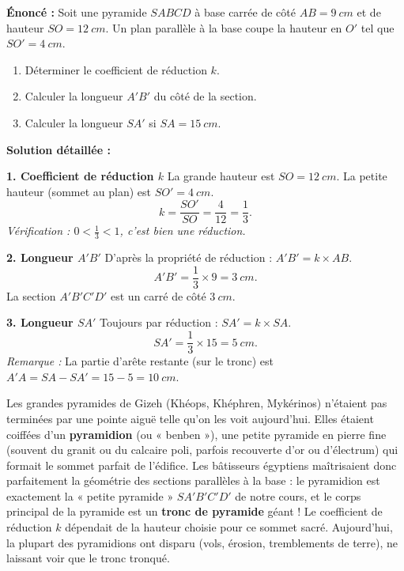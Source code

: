 \documentclass[11pt]{article}
\newcounter{popsec}
\newcounter{popsub}
\newcommand{\courssub}[1]{%
  \stepcounter{popsub}%
  \par\vspace{9pt}\noindent{\popxbold\fontsize{11.5}{13}\selectfont\color{popink}{\color{poporange}\thepopsec.\thepopsub}\hspace{6pt}#1}\par\nopagebreak\vspace{4pt}
}
\begin{document}
\begin{exoresolu}
\textbf{Énoncé :} Soit une pyramide $SABCD$ à base carrée de côté $AB = \SI{9}{cm}$ et de hauteur $SO = \SI{12}{cm}$. Un plan parallèle à la base coupe la hauteur en $O'$ tel que $SO' = \SI{4}{cm}$.
\begin{enumerate}
    \item Déterminer le coefficient de réduction $k$.
    \item Calculer la longueur $A'B'$ du côté de la section.
    \item Calculer la longueur $SA'$ si $SA = \SI{15}{cm}$.
\end{enumerate}

\textbf{Solution détaillée :}

\noindent \textbf{1. Coefficient de réduction $k$}
La grande hauteur est $SO = \SI{12}{cm}$. La petite hauteur (sommet au plan) est $SO' = \SI{4}{cm}$.
\[
k = \frac{SO'}{SO} = \frac{4}{12} = \frac{1}{3}.
\]
\emph{Vérification : $0 < \frac{1}{3} < 1$, c'est bien une réduction.}

\noindent \textbf{2. Longueur $A'B'$}
D'après la propriété de réduction : $A'B' = k \times AB$.
\[
A'B' = \frac{1}{3} \times 9 = \SI{3}{cm}.
\]
La section $A'B'C'D'$ est un carré de côté $\SI{3}{cm}$.

\noindent \textbf{3. Longueur $SA'$}
Toujours par réduction : $SA' = k \times SA$.
\[
SA' = \frac{1}{3} \times 15 = \SI{5}{cm}.
\]
\emph{Remarque :} La partie d'arête restante (sur le tronc) est $A'A = SA - SA' = 15 - 5 = \SI{10}{cm}$.
\end{exoresolu}

\courssub{Le savais-tu ?}

\begin{savaistu}
Les grandes pyramides de Gizeh (Khéops, Khéphren, Mykérinos) n'étaient pas terminées par une pointe aiguë telle qu'on les voit aujourd'hui. Elles étaient coiffées d'un \textbf{pyramidion} (ou « benben »), une petite pyramide en pierre fine (souvent du granit ou du calcaire poli, parfois recouverte d'or ou d'électrum) qui formait le sommet parfait de l'édifice.
Les bâtisseurs égyptiens maîtrisaient donc parfaitement la géométrie des sections parallèles à la base : le pyramidion est exactement la « petite pyramide » $SA'B'C'D'$ de notre cours, et le corps principal de la pyramide est un \textbf{tronc de pyramide} géant ! Le coefficient de réduction $k$ dépendait de la hauteur choisie pour ce sommet sacré. Aujourd'hui, la plupart des pyramidions ont disparu (vols, érosion, tremblements de terre), ne laissant voir que le tronc tronqué.
\end{savaistu}
\end{document}
